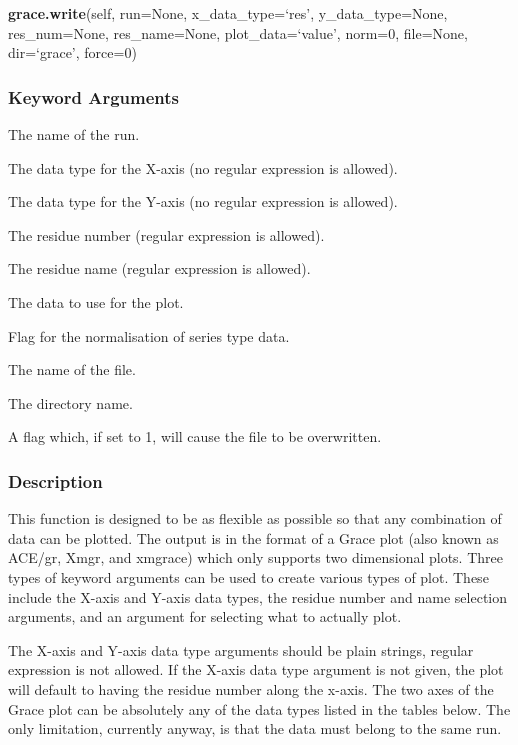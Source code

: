  \textsf{\textbf{grace.write}(self, run=None, x\_data\_type=`res', y\_data\_type=None, res\_num=None, res\_name=None, plot\_data=`value', norm=0, file=None, dir=`grace', force=0)} 

  
 \subsubsection{Keyword Arguments} 

   The name of the run.   

   The data type for the X-axis (no regular expression is allowed).   

   The data type for the Y-axis (no regular expression is allowed).   

   The residue number (regular expression is allowed).   

   The residue name (regular expression is allowed).   

   The data to use for the plot.   

   Flag for the normalisation of series type data.   

   The name of the file.   

   The directory name.   

   A flag which, if set to 1, will cause the file to be overwritten.  

  

  
 \subsubsection{Description} 

 This function is designed to be as flexible as possible so that any combination of data can be plotted.  The output is in the format of a Grace plot (also known as ACE/gr, Xmgr, and xmgrace) which only supports two dimensional plots.  Three types of keyword arguments can be used to create various types of plot.  These include the X-axis and Y-axis data types, the residue number and name selection arguments, and an argument for selecting what to actually plot. 
  

 The X-axis and Y-axis data type arguments should be plain strings, regular expression is not allowed.  If the X-axis data type argument is not given, the plot will default to having the residue number along the x-axis.  The two axes of the Grace plot can be absolutely any of the data types listed in the tables below.  The only limitation, currently anyway, is that the data must belong to the same run. 
  

